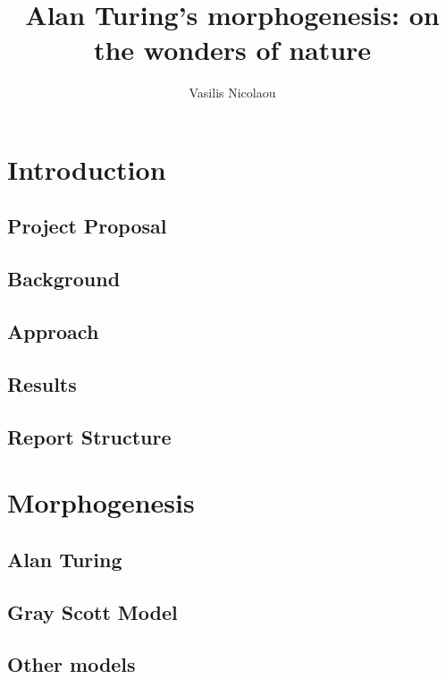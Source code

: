 \documentclass[12pt,a4paper]{report}
\title{Alan Turing's morphogenesis: on the wonders of nature}
\author{Vasilis Nicolaou}
\begin{document}
\maketitle
\tableofcontents
\newpage

\begin{abstract}
\end{abstract}

\chapter{Introduction}

	\section{Project Proposal}

	\section{Background}
	
	\section{Approach}

	\section{Results}
		
	\section{Report Structure}

\chapter{Morphogenesis}

	\section{Alan Turing}	

	\section{Gray Scott Model}

	\section{Other models}
\end{document}
